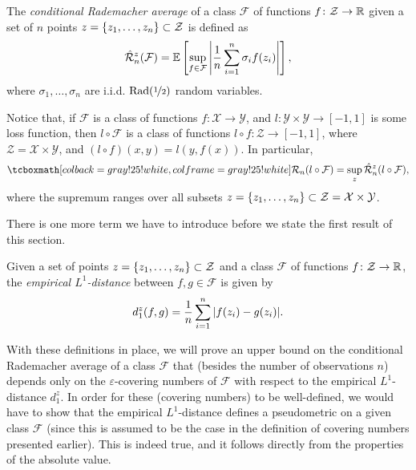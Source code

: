 \begin{definition}
The \emph{conditional Rademacher average} of a class $\mathcal{F}$ of functions $f \colon \mathcal{Z} \to \mathbb{R}$ given a set of $n$ points $z = \left\{z_1, \dots, z_n\right\} \subset \mathcal{Z}$ is defined as
\[
    \hat{\mathcal{R}}_n^z(\mathcal{F}) = \mathbb{E}\left[\sup_{f \in \mathcal{F}} \abs{\frac{1}{n} \sum_{i=1}^n \sigma_i f(z_i)}\right],
\]
where $\sigma_1, \dots, \sigma_n$ are i.i.d. $\mathrm{Rad}(\nicefrac{1}{2})$ random variables.
\end{definition}

Notice that, if $\mathcal{F}$ is a class of functions $f \colon \mathcal{X} \to \mathcal{Y}$, and $l \colon \mathcal{Y} \times \mathcal{Y} \to [-1, 1]$ is some loss function, then $l \circ \mathcal{F}$ is a class of functions $l \circ f \colon \mathcal{Z} \to [-1, 1]$, where $\mathcal{Z} = \mathcal{X} \times \mathcal{Y}$, and $(l \circ f) (x, y) = l(y, f(x))$. In particular,
\begin{equation}
\label{eq: rademacher complexity and conditional rademacher average}
    \highlightMath{
        \mathcal{R}_n(l \circ \mathcal{F}) = \sup_z \hat{\mathcal{R}}_n^z(l \circ \mathcal{F}),
    }
\end{equation}
where the supremum ranges over all subsets $z = \left\{z_1, \dots, z_n\right\} \subset \mathcal{Z} = \mathcal{X} \times \mathcal{Y}$.

There is one more term we have to introduce before we state the first result of this section.

\begin{definition}
Given a set of points $z = \left\{z_1, \dots, z_n\right\} \subset \mathcal{Z}$ and a class $\mathcal{F}$ of functions $f \colon \mathcal{Z} \to \mathbb{R}$, the \emph{empirical $L^1$-distance} between $f, g \in \mathcal{F}$ is given by
\[
    d_1^z(f, g) = \frac{1}{n} \sum_{i=1}^n \abs{f(z_i) - g(z_i)}.
\]
\end{definition}

With these definitions in place, we will prove an upper bound on the conditional Rademacher average of a class $\mathcal{F}$ that (besides the number of observations $n$) depends only on the $\varepsilon$-covering numbers of $\mathcal{F}$ with respect to the empirical $L^1$-distance $d_1^z$. In order for these (covering numbers) to be well-defined, we would have to show that the empirical $L^1$-distance defines a pseudometric on a given class $\mathcal{F}$ (since this is assumed to be the case in the definition of covering numbers presented earlier). This is indeed true, and it follows directly from the properties of the absolute value.


